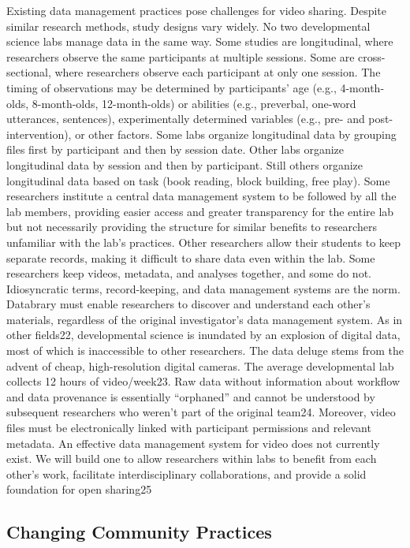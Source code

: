 \documentclass[letterpaper,man,apacite]{apa6}
\begin{document}
Existing data management practices pose challenges for video sharing.
Despite similar research methods, study designs vary widely. 
No two developmental science labs manage data in the same way. 
Some studies are longitudinal, where researchers observe the same participants at
multiple sessions. 
Some are cross-sectional, where researchers observe
each participant at only one session. 
The timing of observations may be
determined by participants’ age (e.g., 4-month-olds, 8-month-olds,
12-month-olds) or abilities (e.g., preverbal, one-word utterances,
sentences), experimentally determined variables (e.g., pre- and
post-intervention), or other factors. 
Some labs organize longitudinal data by grouping files first by participant and then by session date.
Other labs organize longitudinal data by session and then by
participant. 
Still others organize longitudinal data based on task (book reading, block building, free play). Some researchers institute a central data management system to be followed by all the lab members, providing easier access and greater transparency for the entire lab but not necessarily providing the structure for similar benefits to
researchers unfamiliar with the lab’s practices. 
Other researchers allow their students to keep separate records, making it difficult to share
data even within the lab. 
Some researchers keep videos, metadata, and analyses together, and some do not. Idiosyncratic terms, record-keeping, and data management systems are the norm. 
Databrary must enable researchers to discover and understand each other’s materials, regardless of the original investigator’s data management system.
As in other fields22, developmental science is inundated by an explosion of digital data, most of which is inaccessible to other researchers. The data deluge stems from the advent of cheap, high-resolution digital cameras. The average developmental lab collects 12 hours of video/week23. Raw data without information about workflow and data provenance is essentially “orphaned” and cannot be understood by subsequent researchers who weren’t part of the original team24. Moreover, video files must be electronically linked with participant permissions and relevant metadata. An effective data management system for video does not currently exist. We will build one to allow researchers within labs to benefit from each other’s work, facilitate interdisciplinary collaborations, and provide a solid foundation for open sharing25

\subsection{Changing Community Practices}
\end{document}
